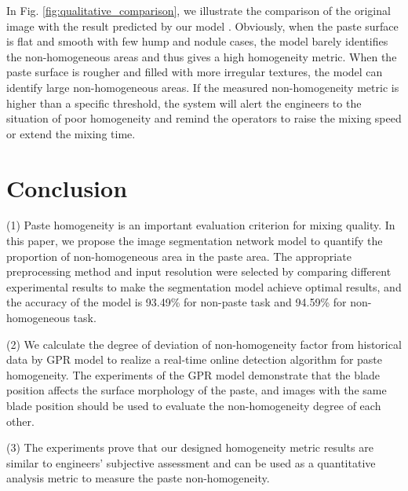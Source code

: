 \documentclass[pdflatex,sn-mathphys]{sn-jnl}%
\theoremstyle{thmstyleone}%
\theoremstyle{thmstyletwo}%
\theoremstyle{thmstylethree}%
\begin{document}
In Fig. \ref{fig:qualitative_comparison}, we illustrate the comparison of the original image with the result predicted by our model . 
Obviously, when the paste surface is flat and smooth with few hump and nodule cases, the model barely identifies the non-homogeneous areas and thus gives a high homogeneity metric. 
When the paste surface is rougher and filled with more irregular textures, the model can identify large non-homogeneous areas.
If the measured non-homogeneity metric is higher than a specific threshold, the system will alert the engineers to the situation of poor homogeneity and remind the operators to raise the mixing speed or extend the mixing time.

\section{Conclusion}\label{sec6}

(1) Paste homogeneity is an important evaluation criterion for mixing quality. In this paper, we propose the image segmentation network model to quantify the proportion of non-homogeneous area in the paste area. The appropriate preprocessing method and input resolution were selected by comparing different experimental results to make the segmentation model achieve optimal results, and the accuracy of the model is 93.49\% for non-paste task and 94.59\% for non-homogeneous task.     

(2) We calculate the degree of deviation of non-homogeneity factor from historical data by GPR model to realize a real-time online detection algorithm for paste homogeneity. The experiments of the GPR model demonstrate that the blade position affects the surface morphology of the paste, and images with the same blade position should be used to evaluate the non-homogeneity degree of each other.        

(3) The experiments prove that our designed homogeneity metric results are similar to engineers' subjective assessment and can be used as a quantitative analysis metric to measure the paste non-homogeneity.



\end{document}
